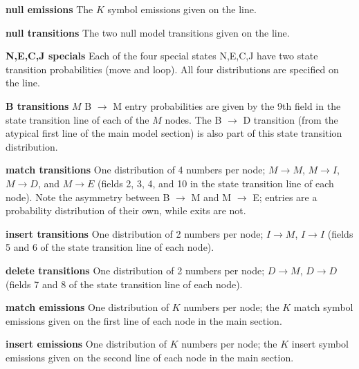 \begin{wideitem}

\item [\textbf{null emissions}] The $K$ symbol emissions 
given on the  line.

\item [\textbf{null transitions}] The two null model transitions
given on the  line.

\item [\textbf{N,E,C,J specials}] Each of the four special states N,E,C,J have two
state transition probabilities (move and loop). All four distributions
are specified on the  line.

\item [\textbf{B transitions}] $M$ B $\rightarrow$
M entry probabilities are given by the 9th field in the state
transition line of each of the $M$ nodes. The B $\rightarrow$ D
transition (from the atypical first line of the main model section) is
also part of this state transition distribution.

\item [\textbf{match transitions}] One distribution of 4 numbers per node; $M \rightarrow M$, 
$M \rightarrow I$, $M \rightarrow D$, and $M \rightarrow E$ (fields 2,
3, 4, and 10 in the state transition line of each node). Note the
asymmetry between B $\rightarrow$ M and M $\rightarrow$ E; entries are
a probability distribution of their own, while exits are not.

\item [\textbf{insert transitions}] One distribution of 2 numbers per node; $I \rightarrow M$, 
$I \rightarrow I$ (fields 5 and 6 of the state transition line of each
node).

\item [\textbf{delete transitions}] One distribution of 2 numbers per
node; $D \rightarrow M$, $D \rightarrow D$ (fields 7 and 8 of the
state transition line of each node).

\item [\textbf{match emissions}] One distribution of $K$ numbers
per node; the $K$ match symbol emissions given on the first line of
each node in the main section.

\item [\textbf{insert emissions}] One distribution of $K$ numbers
per node; the $K$ insert symbol emissions given on the second line of
each node in the main section.

\end{wideitem}

